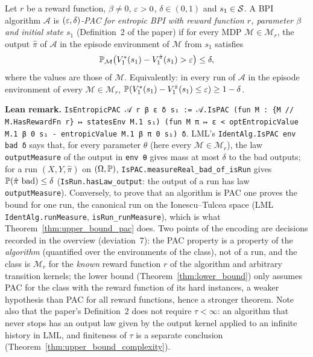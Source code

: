 \begin{definition}\label{def:entropic_pac}
\leanok
{}
Let $r$ be a reward function, $\beta \ne 0$, $\varepsilon > 0$, $\delta \in (0, 1)$ and $s_1 \in \mathcal{S}$. A
BPI algorithm $\mathcal A$ is \emph{$(\varepsilon, \delta)$-PAC for entropic BPI with reward function
$r$, parameter $\beta$ and initial state $s_1$} (Definition~2 of the paper) if for every MDP
$\mathcal M \in \mathcal M_r$, the output $\hat\pi$ of $\mathcal A$ in the episode environment of
$\mathcal M$ from $s_1$ satisfies
\[
  \mathbb{P}_{\mathcal M}\big( V^*_1(s_1) - V^{\hat\pi}_1(s_1) > \varepsilon \big) \le \delta ,
\]
where the values are those of $\mathcal M$. Equivalently: in every run of $\mathcal A$ in the episode
environment of every $\mathcal M \in \mathcal M_r$, $\mathbb{P}(V^*_1(s_1) - V^{\hat\pi}_1(s_1) \le \varepsilon) \ge 1 - \delta$.
\end{definition}

\textbf{Lean remark.} \texttt{IsEntropicPAC 𝒜 r β ε δ s₁ := 𝒜.IsPAC (fun M : \{M // M.HasRewardFn r\} ↦ statesEnv M.1 s₁) (fun M π ↦ ε < optEntropicValue M.1 β 0 s₁ - entropicValue M.1 β π 0 s₁) δ}.
LML's \texttt{IdentAlg.IsPAC env bad δ} says that, for every parameter $\theta$ (here every
$\mathcal M \in \mathcal M_r$), the law \texttt{outputMeasure} of the output in \texttt{env θ} gives
mass at most $\delta$ to the bad outputs; for a run $(X, Y, \hat\pi)$ on $(\Omega, \mathbb{P})$,
\texttt{IsPAC.measureReal\_bad\_of\_isRun} gives $\mathbb{P}(\hat\pi \text{ bad}) \le \delta$
(\texttt{IsRun.hasLaw\_output}: the output of a run has law \texttt{outputMeasure}). Conversely,
to prove that an algorithm is PAC one proves the bound for one run, the canonical run on the
Ionescu--Tulcea space (LML \texttt{IdentAlg.runMeasure}, \texttt{isRun\_runMeasure}), which
is what Theorem~\ref{thm:upper_bound_pac} does. Two points of the encoding are decisions
recorded in the overview (deviation~7): the PAC property is a property of the \emph{algorithm}
(quantified over the environments of the class), not of a run, and the class is
$\mathcal M_r$ for the \emph{known} reward function $r$ of the algorithm and arbitrary
transition kernels; the lower bound (Theorem~\ref{thm:lower_bound}) only assumes PAC for the
class with the reward function of its hard instances, a weaker hypothesis than PAC for all
reward functions, hence a stronger theorem. Note also that the paper's Definition~2 does not
require $\tau < \infty$: an algorithm that never stops has an output law given by the output
kernel applied to an infinite history in LML, and finiteness of $\tau$ is a separate
conclusion (Theorem~\ref{thm:upper_bound_complexity}).
